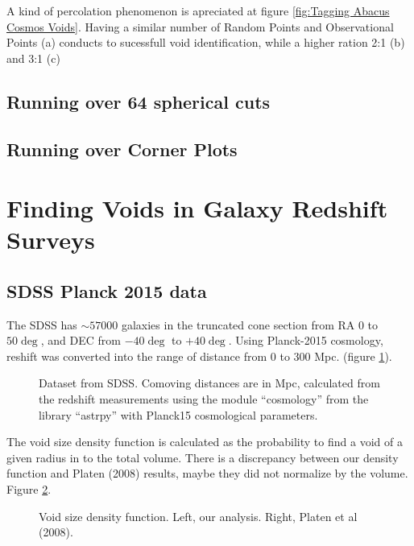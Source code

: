 \documentclass[preprint]{aastex62}
\begin{document}
A kind of percolation phenomenon is apreciated at figure
\ref{fig:Tagging Abacus Cosmos Voids}. Having a similar number of Random Points
and Observational Points (a) conducts to sucessfull void identification, while
a higher ration 2:1 (b) and 3:1 (c) 

\subsection{Running over 64 spherical cuts}

\subsection{Running over Corner Plots}







\section{Finding Voids in Galaxy Redshift Surveys}


\subsection{SDSS Planck 2015 data}

The SDSS has $\sim 57000$ galaxies in the truncated cone section from RA 0 to $50\deg$,
and DEC from $-40\deg$ to $+40\deg$. Using Planck-2015 cosmology, reshift was converted into the
range of distance from 0 to 300 Mpc. (figure \ref{fig:Planck15_cat}).
\begin{figure}
  \caption{Dataset from SDSS. Comoving distances are in Mpc, calculated from the redshift
    measurements using the module ``cosmology'' from the library ``astrpy'' with Planck15
    cosmological parameters.
    \label{fig:Planck15_cat}}
\end{figure}

The void size density function is calculated as the probability to find a void
of a given radius in to the total volume. There is a discrepancy between our density function
and Platen (2008) results, maybe they did not normalize by the volume.
Figure \ref{fig:size_density_function}.

\begin{figure}
  \caption{Void size density function. Left, our analysis. Right, Platen et al (2008).
    \label{fig:size_density_function}}
\end{figure}
\end{document}
